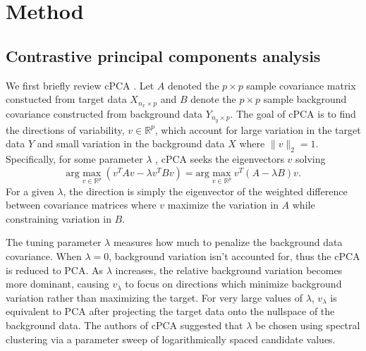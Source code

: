 \documentclass[12pt]{article}
\begin{document}

\section{Method}


\subsection{Contrastive principal components analysis}
We first briefly review cPCA \cite{Abid}. Let $A$ denoted the $p\times p$ sample covariance matrix constucted from target data $X_{n_x \times p}$ and $B$ denote the $p\times p$ sample background covariance constructed from background data $Y_{n_y \times p}$. The goal of cPCA is to find the directions of variability, $v \in \mathbb{R}^p$, which account for large variation in the target data $Y$ and small variation in the background data $X$ where $\|v\|_2 = 1$. Specifically, for some parameter $\lambda$ , cPCA seeks the eigenvectors $v$ solving
\[\text{arg}\max_{v \in \mathbb{R}^p}{\left(v^TAv - \lambda v^TBv\right)} = \text{arg}\max_{v \in \mathbb{R}^p}{v^T\left(A - \lambda B\right)v}.\]
For a given $\lambda$, the direction is simply the eigenvector of the weighted difference between covariance matrices where $v$ maximize the variation in $A$ while constraining variation in $B$.

The tuning parameter $\lambda$ measures how much to penalize the background data covariance. When $\lambda = 0$, background variation isn't accounted for, thus the cPCA is reduced to PCA. As $\lambda$ increases, the relative background variation becomes more dominant, causing $v_\lambda$ to focus on directions which minimize background variation rather than maximizing the target. For very large values of $\lambda$, $v_\lambda$ is equivalent to PCA after projecting the target data onto the nullspace of the background data.  The authors of cPCA suggested that $\lambda$ be chosen using spectral clustering via a parameter sweep of logarithmically spaced candidate values.
\end{document}
